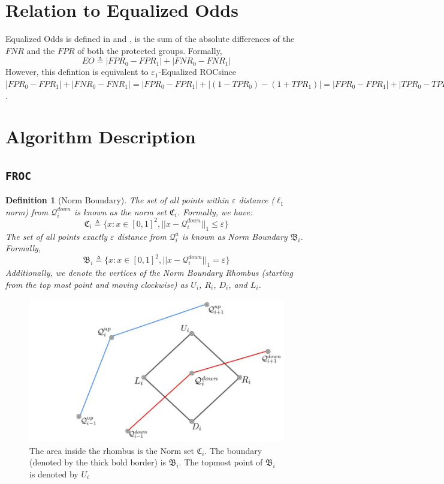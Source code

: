 \documentclass{article}
\newtheorem{definition}{Definition}[section]
\newcommand{\ouralgo}{\texttt{FROC}}
\newcommand{\ourdef}{-Equalized ROC}
\begin{document}
\section{Relation to Equalized Odds}
Equalized Odds is defined in \cite{padala21} and \cite{madras2018learning}, is the sum of the absolute differences of the $FNR$ and the $FPR$ of both the protected groups. Formally,
\[EO \triangleq |FPR_0 - FPR_1| + |FNR_0 - FNR_1|\]
However, this defintion is equivalent to $\varepsilon_1$\ourdef since $|FPR_0 - FPR_1| + |FNR_0 - FNR_1| = |FPR_0 - FPR_1| + |(1 - TPR_0) -(1 +  TPR_1)| =|FPR_0 - FPR_1| + |TPR_0 - TPR_1|$.

\section{Algorithm Description}

\subsection{\ouralgo}
\begin{definition}[Norm Boundary] \label{def:eNBoundary}
The set of all points within $\varepsilon$ distance ($\ell_1$ norm) from $\mathcal{Q}_i^{down}$ is known as the \emph{norm set} $\mathfrak{C}_i$. Formally, we have:
\[\mathfrak{C}_i \triangleq \{ x: x\in [0,1]^2 , ||x - \mathcal{Q}_i^{down}||_1 \le \varepsilon\}\]
The set of all points exactly $\varepsilon$ distance from $\mathcal{Q}_i^a$ is known as \emph{Norm Boundary} $\mathfrak{B}_i$. Formally, 
\[\mathfrak{B}_i \triangleq \{ x: x\in [0,1]^2 , ||x - \mathcal{Q}_i^{down}||_1 = \varepsilon\}\]
Additionally, we denote the vertices of the Norm Boundary Rhombus (starting from the top most point and moving clockwise) as $U_i$, $R_i$, $D_i$, and $L_i$.
\end{definition}

\begin{figure}[!h]
    \centering
    \includegraphics[scale = 0.2]{diagrams/NormBoundary_modified.jpg}
    \caption{The area inside the rhombus is the Norm set $\mathfrak{C}_i$. The boundary (denoted by the thick bold border) is $\mathfrak{B}_i$. The topmost point of $\mathfrak{B}_i$ is denoted by $U_i$}
    \label{fig:enter-label}
\end{figure}
\end{document}
